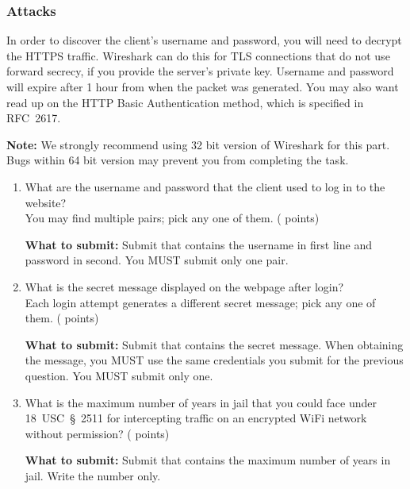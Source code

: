 \pagebreak

\subsubsection*{Attacks}
In order to discover the client's username and password, you will need to decrypt the HTTPS traffic.
Wireshark can do this for TLS connections that do not use forward secrecy, if you provide the server's private key.
Username and password will expire after 1 hour from when the packet was generated.
You may also want read up on the HTTP Basic Authentication method, which is specified in RFC~2617.

\textbf{Note:} We strongly recommend using 32 bit version of Wireshark for this part. Bugs within 64 bit version may prevent you from completing the task.

\begin{enumerate}[resume]
  \item \hypertarget{cp2cred}{What are the username and password that the client used to log in to the website?\\
  You may find multiple pairs; pick any one of them. ( points)} \label{itm:cred}

    \textbf{What to submit:} Submit
      \texttt{\hyperlink{credformat}{\filecred}} that contains the username in first line and password in second.
      You MUST submit only one pair.

  \item \hypertarget{cp2secret}{What is the secret message displayed on the webpage after login?\\
  Each login attempt generates a different secret message; pick any one of them. ( points)} \label{itm:secret}

    \textbf{What to submit:} Submit
      \texttt{\hyperlink{secretformat}{\filesecret}} that contains the secret message.
      When obtaining the message, you MUST use the same credentials you submit for the previous question.
      You MUST submit only one.

  \item \hypertarget{cp2jailtime}{What is the maximum number of years in jail that you could face under 18~USC~\S~2511 for intercepting traffic on an encrypted WiFi network without permission? ( points)} \label{itm:jailtime}

    \textbf{What to submit:} Submit
      \texttt{\hyperlink{jailtimeformat}{\filejailtime}} that contains the maximum number of years in jail.
      Write the number only.

\end{enumerate}

